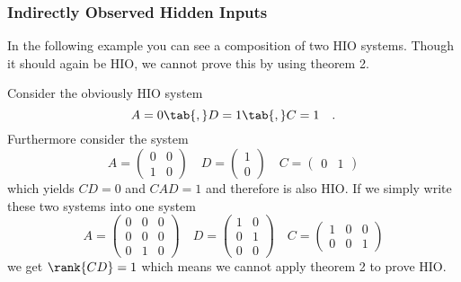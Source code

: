 \subsubsection{Indirectly Observed Hidden Inputs}
In the following example you can see a composition of two HIO systems. Though it should 
again be HIO, we cannot prove this by using theorem 2.
\begin{example}{}{}
	Consider the obviously HIO system
	\begin{equation}
	A = 0 \tab{,} D = 1 \tab{,} C = 1 \quad .
	\end{equation}
	Furthermore consider the system
	\begin{equation}
	A = \begin{pmatrix}
	0 & 0 \\ 1 & 0
	\end{pmatrix}
	\quad
	D = \begin{pmatrix}
	1 \\ 0
	\end{pmatrix}
	\quad 
	C = \begin{pmatrix}
	0 & 1
	\end{pmatrix}
	\end{equation}
 	which yields $CD = 0$ and $CAD=1$ and therefore is also HIO.
 	If we simply write these two systems into one system
	\begin{equation}
	A = \begin{pmatrix}
	0 & 0 & 0 \\ 0 & 0 & 0 \\ 0 & 1 & 0
	\end{pmatrix}
	\quad
	D = \begin{pmatrix}
	1  & 0\\ 0 & 1 \\ 0 & 0
	\end{pmatrix}
	\quad 
	C = \begin{pmatrix}
	1&0&0\\0 &0 & 1
	\end{pmatrix}
	\end{equation}
 	we get $\rank{CD}=1$ which means we cannot apply theorem 2 to prove HIO.
\end{example}

